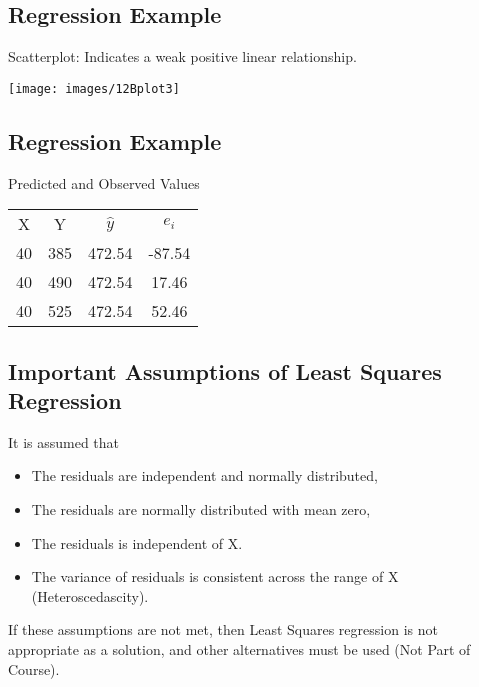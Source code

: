 \documentclass[]{report}
\begin{document}
	
	
	\subsection{Regression Example}
	Scatterplot: Indicates a weak positive linear relationship.
	
	\begin{center}
		\texttt{[image: images/12Bplot3]}
	\end{center}
	
	
	
	\subsection{Regression Example}
	
	Predicted and Observed Values
	
	\begin{center}
		\begin{tabular}{|c|c|c|c|}
			\hline
			X & Y& $\hat{y}$ & $e_i$ \\
			40 &385 &472.54 &-87.54\\
			40 &490 &472.54 & 17.46\\
			40 &525 &472.54 & 52.46\\
			\hline
		\end{tabular}
	\end{center}
	
	
	
	\subsection{Important Assumptions of Least Squares Regression}
	It is assumed that
	\begin{itemize}
		\item The residuals are independent and normally distributed,
		\item The residuals are normally distributed with mean zero,
		\item The residuals is independent of X.
		\item The variance of residuals is consistent across the range of X (Heteroscedascity).
	\end{itemize}
	If these assumptions are not met, then Least Squares regression is not appropriate as a solution, and other alternatives must be used (Not Part of Course).
	
\end{document}
